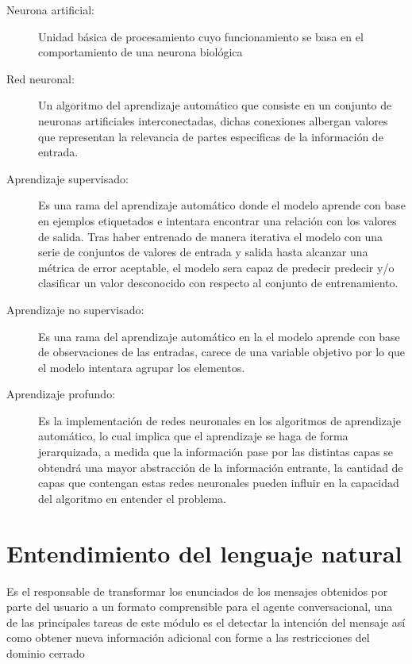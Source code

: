         \begin{description}
            \item[Neurona artificial:] Unidad básica de procesamiento cuyo funcionamiento se basa en el comportamiento de una neurona biológica
            \item[Red neuronal:] Un algoritmo del aprendizaje automático que consiste en un conjunto de neuronas artificiales interconectadas, dichas conexiones albergan valores que representan la relevancia de partes especificas de la información de entrada.
            \item[Aprendizaje supervisado:] Es una rama del aprendizaje automático donde el modelo aprende con base en ejemplos etiquetados e intentara encontrar una relación con los valores de salida. Tras haber entrenado de manera iterativa el modelo con una serie de conjuntos de valores de entrada y salida hasta alcanzar una métrica de error aceptable, el modelo sera capaz de predecir predecir y/o clasificar un valor desconocido con respecto al conjunto de entrenamiento.
            \item[Aprendizaje no supervisado:] Es una rama del aprendizaje automático en la el modelo aprende con base de observaciones de las entradas, carece de una variable objetivo por lo que el modelo intentara agrupar los elementos.
            \item[Aprendizaje profundo:] Es la implementación de redes neuronales en los algoritmos de aprendizaje automático, lo cual implica que el aprendizaje se haga de forma jerarquizada, a medida que la información pase por las distintas capas se obtendrá una mayor abstracción de la información entrante, la cantidad de capas que contengan estas redes neuronales pueden influir en la capacidad del algoritmo en entender el problema.
        \end{description}
        
        
        
        \section{Entendimiento del lenguaje natural}
            Es el responsable de transformar los enunciados de los mensajes obtenidos por parte del usuario a un formato comprensible para el agente conversacional, una de las principales tareas de este módulo es el detectar la intención del mensaje así como obtener nueva información adicional con forme a las restricciones del dominio cerrado 
            
